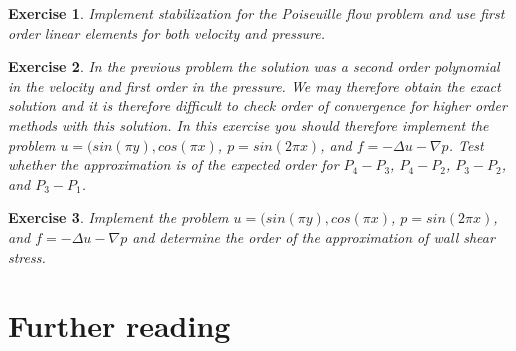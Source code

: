 \documentclass[a4paper,11pt]{amsart}
\newtheorem{exercise}{Exercise}[section]
\begin{document}
\begin{exercise}
Implement stabilization for the Poiseuille flow problem and use first order linear elements
for both velocity and pressure.
\end{exercise}

\begin{exercise}
In the previous problem the solution was a second order polynomial in the velocity and
first order in the pressure. We may therefore obtain the exact solution and it
is therefore difficult to check order of convergence for higher order methods with
this solution. In this exercise you should therefore
implement the problem $u=(sin(\pi y), cos( \pi x)$, $p=sin(2 \pi x)$, and $f = -\Delta u - \nabla p$.
Test whether the approximation is of the expected order for $P_4-P_3$, $P_4-P_2$, $P_3-P_2$, and $P_3-P_1$.

\end{exercise}

\begin{exercise}
Implement the problem $u=(sin(\pi y), cos( \pi x)$, $p=sin(2 \pi x)$, and $f = -\Delta u - \nabla p$
and determine the order of the approximation of wall shear stress.
\end{exercise}




\section{Further reading}
\end{document}
